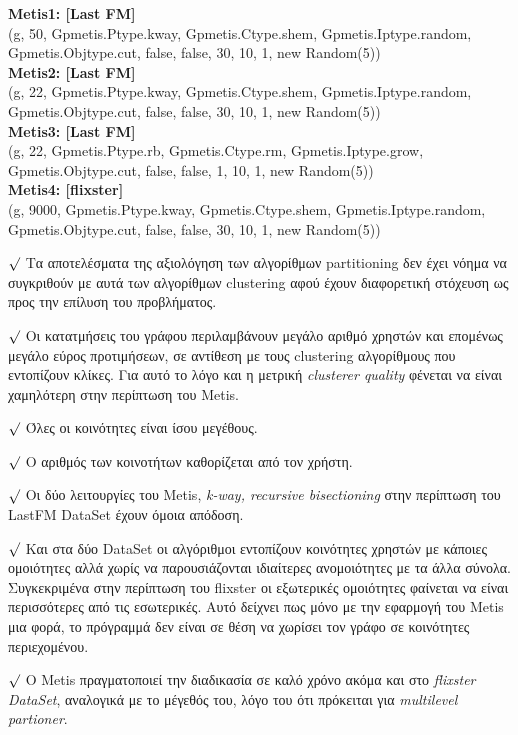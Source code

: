 \vspace{2cm}
\noindent
\textbf{Metis1: [Last FM]}\\ (g, 50, Gpmetis.Ptype.kway, Gpmetis.Ctype.shem, Gpmetis.Iptype.random, Gpmetis.Objtype.cut, false, false, 30, 10, 1, new Random(5)) \\
\textbf{Metis2: [Last FM]}\\ (g, 22, Gpmetis.Ptype.kway, Gpmetis.Ctype.shem, Gpmetis.Iptype.random, Gpmetis.Objtype.cut, false, false, 30, 10, 1, new Random(5)) \\  
\textbf{Metis3: [Last FM]}\\ (g, 22, Gpmetis.Ptype.rb, Gpmetis.Ctype.rm, Gpmetis.Iptype.grow, Gpmetis.Objtype.cut, false, false, 1, 10, 1, new Random(5))   \\
\textbf{Metis4: [flixster]}\\ (g, 9000, Gpmetis.Ptype.kway, Gpmetis.Ctype.shem, Gpmetis.Iptype.random, Gpmetis.Objtype.cut, false, false, 30, 10, 1, new Random(5)) 

\vspace{1cm}
\noindent
$\surd$ Τα αποτελέσματα της αξιολόγηση των αλγορίθμων partitioning δεν έχει νόημα να συγκριθούν 
με αυτά των αλγορίθμων clustering αφού έχουν διαφορετική στόχευση ως προς την επίλυση
του προβλήματος.

\noindent
$\surd$ Οι κατατμήσεις του γράφου περιλαμβάνουν μεγάλο αριθμό χρηστών και επομένως μεγάλο εύρος 
προτιμήσεων, σε αντίθεση με τους clustering αλγορίθμους που εντοπίζουν κλίκες. Για αυτό το λόγο 
και η μετρική \emph{clusterer quality} φένεται να είναι χαμηλότερη στην περίπτωση του Metis.

\noindent
$\surd$ Όλες οι κοινότητες είναι ίσου μεγέθους.

\noindent
$\surd$ Ο αριθμός των κοινοτήτων καθορίζεται από τον χρήστη.

\noindent
$\surd$ Οι δύο λειτουργίες του Metis, \emph{k-way, recursive bisectioning} στην περίπτωση
του LastFM DataSet έχουν όμοια απόδοση.

\noindent
$\surd$ Και στα δύο DataSet οι αλγόριθμοι εντοπίζουν κοινότητες χρηστών με κάποιες ομοιότητες
αλλά χωρίς να παρουσιάζονται ιδιαίτερες ανομοιότητες με τα άλλα σύνολα. Συγκεκριμένα στην
περίπτωση του flixster οι εξωτερικές ομοιότητες φαίνεται να είναι περισσότερες από τις
εσωτερικές. Αυτό δείχνει πως μόνο με την εφαρμογή του Metis μια φορά, το πρόγραμμά δεν 
είναι σε θέση να  χωρίσει τον γράφο σε κοινότητες περιεχομένου. 

\noindent
$\surd$ Ο Metis πραγματοποιεί την διαδικασία σε καλό χρόνο ακόμα 
και στο \emph{flixster DataSet}, αναλογικά με το μέγεθός του,
λόγο του ότι πρόκειται για \emph{multilevel partioner}.


